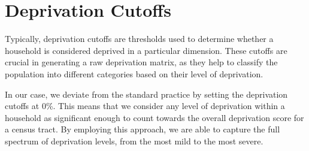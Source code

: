 \documentclass[
  letterpaper,
  DIV=11,
  numbers=noendperiod]{scrreprt}
\begin{document}

\chapter{Deprivation Cutoffs}\label{deprivation-cutoffs}

Typically, deprivation cutoffs are thresholds used to determine whether
a household is considered deprived in a particular dimension. These
cutoffs are crucial in generating a raw deprivation matrix, as they help
to classify the population into different categories based on their
level of deprivation.

In our case, we deviate from the standard practice by setting the
deprivation cutoffs at 0\%. This means that we consider any level of
deprivation within a household as significant enough to count towards
the overall deprivation score for a census tract. By employing this
approach, we are able to capture the full spectrum of deprivation
levels, from the most mild to the most severe.
\end{document}

